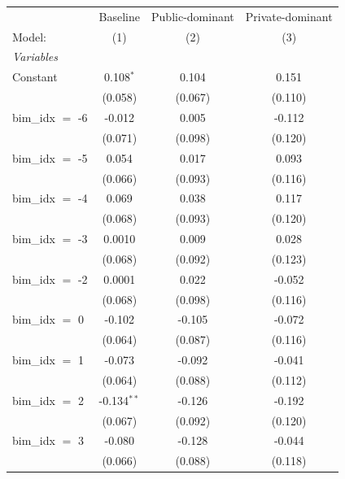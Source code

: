 
\begingroup
\centering
\begin{tabular}{lccc}
   \tabularnewline \midrule \midrule
                       & Baseline       & Public-dominant & Private-dominant \\   
   Model:              & (1)            & (2)             & (3)\\  
   \midrule
   \emph{Variables}\\
   Constant            & 0.108$^{*}$    & 0.104           & 0.151\\   
                       & (0.058)        & (0.067)         & (0.110)\\   
   bim\_idx $=$ -6     & -0.012         & 0.005           & -0.112\\   
                       & (0.071)        & (0.098)         & (0.120)\\   
   bim\_idx $=$ -5     & 0.054          & 0.017           & 0.093\\   
                       & (0.066)        & (0.093)         & (0.116)\\   
   bim\_idx $=$ -4     & 0.069          & 0.038           & 0.117\\   
                       & (0.068)        & (0.093)         & (0.120)\\   
   bim\_idx $=$ -3     & 0.0010         & 0.009           & 0.028\\   
                       & (0.068)        & (0.092)         & (0.123)\\   
   bim\_idx $=$ -2     & 0.0001         & 0.022           & -0.052\\   
                       & (0.068)        & (0.098)         & (0.116)\\   
   bim\_idx $=$ 0      & -0.102         & -0.105          & -0.072\\   
                       & (0.064)        & (0.087)         & (0.116)\\   
   bim\_idx $=$ 1      & -0.073         & -0.092          & -0.041\\   
                       & (0.064)        & (0.088)         & (0.112)\\   
   bim\_idx $=$ 2      & -0.134$^{**}$  & -0.126          & -0.192\\   
                       & (0.067)        & (0.092)         & (0.120)\\   
   bim\_idx $=$ 3      & -0.080         & -0.128          & -0.044\\   
                       & (0.066)        & (0.088)         & (0.118)\\   

\end{tabular}
